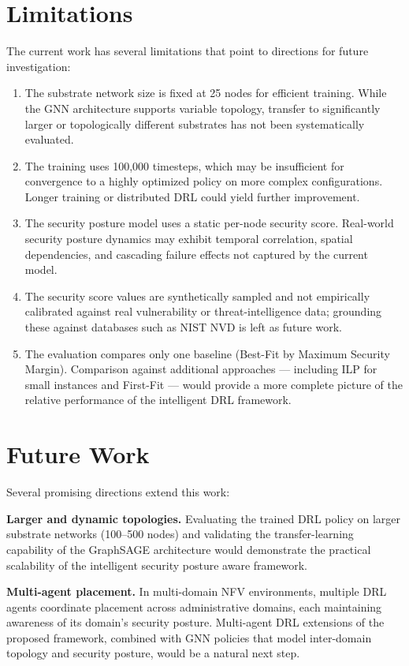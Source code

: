 \section{Limitations}

The current work has several limitations that point to directions for future investigation:

\begin{enumerate}
  \item The substrate network size is fixed at 25 nodes for efficient training. While the GNN architecture supports variable topology, transfer to significantly larger or topologically different substrates has not been systematically evaluated.
  \item The training uses 100,000 timesteps, which may be insufficient for convergence to a highly optimized policy on more complex configurations. Longer training or distributed DRL could yield further improvement.
  \item The security posture model uses a static per-node security score. Real-world security posture dynamics may exhibit temporal correlation, spatial dependencies, and cascading failure effects not captured by the current model.
  \item The security score values are synthetically sampled and not empirically calibrated against real vulnerability or threat-intelligence data; grounding these against databases such as NIST NVD is left as future work.
  \item The evaluation compares only one baseline (Best-Fit by Maximum Security Margin). Comparison against additional approaches — including ILP for small instances and First-Fit — would provide a more complete picture of the relative performance of the intelligent DRL framework.
\end{enumerate}

\section{Future Work}

Several promising directions extend this work:

\textbf{Larger and dynamic topologies.} Evaluating the trained DRL policy on larger substrate networks (100–500 nodes) and validating the transfer-learning capability of the GraphSAGE architecture would demonstrate the practical scalability of the intelligent security posture aware framework.

\textbf{Multi-agent placement.} In multi-domain NFV environments, multiple DRL agents coordinate placement across administrative domains, each maintaining awareness of its domain's security posture. Multi-agent DRL extensions of the proposed framework, combined with GNN policies that model inter-domain topology and security posture, would be a natural next step.

